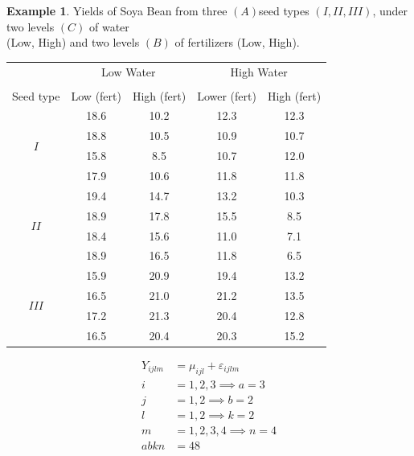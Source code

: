 \documentclass[11pt,a4paper]{article}
\theoremstyle{definition}
\newtheorem{exa}[thm]{Example}
\begin{document}
\begin{exa}
Yields of Soya Bean from three $(A)$seed types $(I,II,III)$, under two levels $(C)$ of water\\ (Low, High)  and two levels $(B)$ of fertilizers (Low, High).\\


\begin{table}[H]
\centering
\begin{tabular}{|c|cc|cc|}
\hline
          & \multicolumn{2}{c|}{Low Water} & \multicolumn{2}{c|}{High Water }\\
&&&&\\
Seed type & Low (fert) & High (fert) & Lower (fert) & High (fert)\\
\hline
\multirow{4}{*}{$I$}
 & 18.6 & 10.2 & 12.3 & 12.3\\
 & 18.8 & 10.5 & 10.9 & 10.7\\
 & 15.8 & 8.5 & 10.7 & 12.0\\
 & 17.9 & 10.6 & 11.8 & 11.8\\
\hline
\multirow{4}{*}{$II$}
& 19.4 & 14.7 & 13.2 & 10.3\\
& 18.9 & 17.8 & 15.5 & 8.5\\
& 18.4 & 15.6 & 11.0 & 7.1\\
& 18.9 & 16.5 & 11.8 & 6.5\\
\hline
\multirow{4}{*}{$III$}
 & 15.9 & 20.9 & 19.4 & 13.2\\
 & 16.5 & 21.0 & 21.2 & 13.5\\
 & 17.2 & 21.3 & 20.4 & 12.8\\
 & 16.5 & 20.4 & 20.3 & 15.2\\
\hline
\end{tabular}
\end{table}


\begin{align*}
Y_{ijlm} & = \mu_{ijl} + \varepsilon_{ijlm}\\
i & = 1,2,3\implies a=3\\
j & = 1,2 \implies b=2\\
l & = 1,2 \implies k=2\\
m & = 1,2,3,4 \implies n=4\\
abkn & = 48
\end{align*}



\end{exa}
\end{document}
